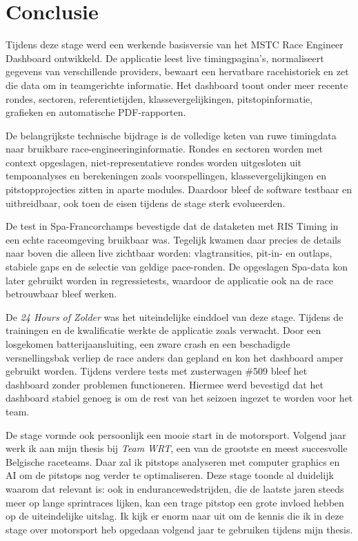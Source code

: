 
\chapter{Conclusie}
\label{chap:conclusie}

Tijdens deze stage werd een werkende basisversie van het MSTC Race Engineer Dashboard
ontwikkeld. De applicatie leest live timingpagina's, normaliseert gegevens van verschillende
providers, bewaart een hervatbare racehistoriek en zet die data om in teamgerichte informatie. Het
dashboard toont onder meer recente rondes, sectoren, referentietijden, klassevergelijkingen,
pitstopinformatie, grafieken en automatische PDF-rapporten.

De belangrijkste technische bijdrage is de volledige keten van ruwe timingdata naar bruikbare
race-engineeringinformatie. Rondes en sectoren worden met context opgeslagen, niet-representatieve
rondes worden uitgesloten uit tempoanalyses en berekeningen zoals voorspellingen,
klassevergelijkingen en pitstopprojecties zitten in aparte modules. Daardoor bleef de software
testbaar en uitbreidbaar, ook toen de eisen tijdens de stage sterk evolueerden.

De test in Spa-Francorchamps bevestigde dat de dataketen met RIS Timing in een echte raceomgeving
bruikbaar was. Tegelijk kwamen daar precies de details naar boven die alleen live zichtbaar worden:
vlagtransities, pit-in- en outlaps, stabiele gaps en de selectie van geldige pace-ronden. De
opgeslagen Spa-data kon later gebruikt worden in regressietests, waardoor de applicatie ook na de race betrouwbaar bleef werken.

De \emph{24 Hours of Zolder} was het uiteindelijke einddoel van deze stage. Tijdens de trainingen en de kwalificatie werkte de applicatie zoals verwacht. Door een losgekomen batterijaansluiting, een zware crash en een beschadigde versnellingsbak verliep de race anders dan gepland en kon het dashboard amper gebruikt worden. Tijdens verdere tests met zusterwagen \#509 bleef het dashboard zonder problemen functioneren. Hiermee werd bevestigd dat het dashboard stabiel genoeg is om de rest van het seizoen ingezet te worden voor het team.

De stage vormde ook persoonlijk een mooie start in de motorsport. Volgend jaar werk ik aan mijn thesis bij \emph{Team WRT}, een van de grootste en meest succesvolle Belgische raceteams. Daar zal ik pitstops
analyseren met computer graphics en AI om de pitstops nog verder te optimaliseren. Deze
stage toonde al duidelijk waarom dat relevant is: ook in endurancewedstrijden, die de laatste jaren
steeds meer op lange sprintraces lijken, kan een trage pitstop een grote invloed hebben op de
uiteindelijke uitslag. Ik kijk er enorm naar uit om de kennis die ik in deze stage over motorsport heb opgedaan volgend jaar te gebruiken tijdens mijn thesis.
